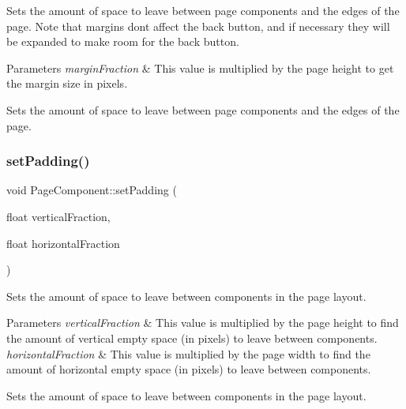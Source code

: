 Sets the amount of space to leave between page components and the edges of the page. Note that margins don\textquotesingle{}t affect the back button, and if necessary they will be expanded to make room for the back button.


\begin{DoxyParams}{Parameters}
{\em margin\+Fraction} & This value is multiplied by the page height to get the margin size in pixels.\\
\hline
\end{DoxyParams}
Sets the amount of space to leave between page components and the edges of the page. \mbox{\label{classPageComponent_a0632af1c5b40e99587ce79a781eee6b6}} 
\subsubsection{\texorpdfstring{set\+Padding()}{setPadding()}}
{\footnotesize\ttfamily void Page\+Component\+::set\+Padding (\begin{DoxyParamCaption}\item[{float}]{vertical\+Fraction,  }\item[{float}]{horizontal\+Fraction }\end{DoxyParamCaption})\hspace{0.3cm}{\ttfamily [protected]}}

Sets the amount of space to leave between components in the page layout.


\begin{DoxyParams}{Parameters}
{\em vertical\+Fraction} & This value is multiplied by the page height to find the amount of vertical empty space (in pixels) to leave between components.\\
\hline
{\em horizontal\+Fraction} & This value is multiplied by the page width to find the amount of horizontal empty space (in pixels) to leave between components.\\
\hline
\end{DoxyParams}
Sets the amount of space to leave between components in the page layout. \mbox{\label{classPageComponent_a94072392071e79cf7d5fe655336aa277}} 
